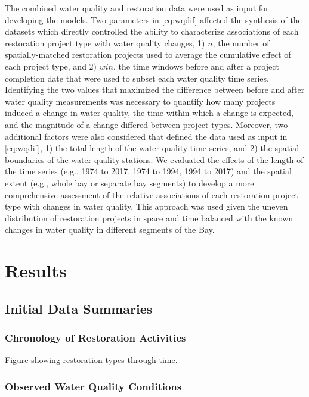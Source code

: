 \documentclass[]{article}
\begin{document}
The combined water quality and restoration data were used as input for
developing the models. Two parameters in \cref{eq:wqdif} affected the
synthesis of the datasets which directly controlled the ability to
characterize associations of each restoration project type with water
quality changes, 1) \(n\), the number of spatially-matched restoration
projects used to average the cumulative effect of each project type, and
2) \(win\), the time windows before and after a project completion date
that were used to subset each water quality time series. Identifying the
two values that maximized the difference between before and after water
quality measurements was necessary to quantify how many projects induced
a change in water quality, the time within which a change is expected,
and the magnitude of a change differed between project types. Moreover,
two additional factors were also considered that defined the data used
as input in \cref{eq:wqdif}, 1) the total length of the water quality
time series, and 2) the spatial boundaries of the water quality
stations. We evaluated the effects of the length of the time series
(e.g., 1974 to 2017, 1974 to 1994, 1994 to 2017) and the spatial extent
(e.g., whole bay or separate bay segments) to develop a more
comprehensive assessment of the relative associations of each
restoration project type with changes in water quality. This approach
was used given the uneven distribution of restoration projects in space
and time balanced with the known changes in water quality in different
segments of the Bay.

\section{Results}\label{results}

\subsection{Initial Data Summaries}\label{initial-data-summaries}

\subsubsection{Chronology of Restoration
Activities}\label{chronology-of-restoration-activities}

Figure showing restoration types through time.

\subsubsection{Observed Water Quality
Conditions}\label{observed-water-quality-conditions}
\end{document}
